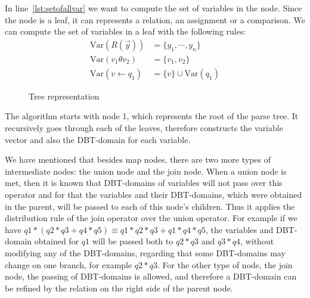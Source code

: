 \documentclass[12pt]{article}
\begin{document}
In line~\ref{lst:setofallvar} we want to compute the set of variables in the node. Since the node is a leaf, it can represents a relation, an assignment or a comparison. We can compute the set of variables in a leaf with the following rules:
\begin{align}
\text{Var}(R(\vec{y}))&=\{y_{1},\cdots,y_{n}\}\\
\text{Var}(v_{1}\theta v_{2})&=\{v_{1},v_{2}\}\\
\text{Var}(v\gets q_{1})&=\{v\}\cup\text{Var}(q_{1})
\end{align}
\begin{figure}[htbp]
\begin{center}
\end{center}
\caption{Tree representation}
\label{fig:map}
\end{figure}

The algorithm starts with node 1, which represents the root of the parse tree. It recursively goes through each of the leaves, therefore constructs the variable vector and also the DBT-domain for each variable.
	
We have mentioned that besides map nodes, there are two more types of intermediate nodes: the union node and the join node. When a union node is met, then it is known that DBT-domains of variables will not pass over this operator and for that the variables and their DBT-domains, which were obtained in the parent, will be passed to each of this node's children. Thus it applies the distribution rule of the join operator over the union operator. For example if we have $ q1 * (q2 * q3 + q4 * q5) \equiv q1 * q2 * q3 + q1 * q4 * q5$, the variables and DBT-domain obtained for $q1$ will be passed both to $q2*q3$ and $q3*q4$, without modifying any of the DBT-domains, regarding that some DBT-domains may change on one branch, for example $q2*q3$. For the other type of node, the join node, the passing of DBT-domains is allowed, and therefore a DBT-domain can be refined by the relation on the right side of the parent node.
	
\end{document}
